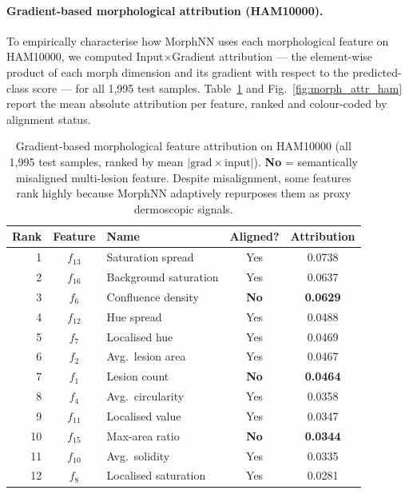 \documentclass[preprint,12pt]{elsarticle}
\begin{document}
\paragraph{Gradient-based morphological attribution (HAM10000).}
To empirically characterise how MorphNN uses each morphological feature
on HAM10000, we computed Input$\times$Gradient attribution --- the
element-wise product of each morph dimension and its gradient with
respect to the predicted-class score --- for all 1,995 test samples.
Table~\ref{tab:morph_attr} and Fig.~\ref{fig:morph_attr_ham} report
the mean absolute attribution per feature, ranked and colour-coded by
alignment status.

\begin{table}[htbp]
\centering
\caption{Gradient-based morphological feature attribution on HAM10000
  (all 1,995 test samples, ranked by mean $|\text{grad} \times \text{input}|$).
  \textbf{No} = semantically misaligned multi-lesion feature.
  Despite misalignment, some features rank highly because MorphNN
  adaptively repurposes them as proxy dermoscopic signals.}
\label{tab:morph_attr}
\setlength{\tabcolsep}{4pt}
\renewcommand{\arraystretch}{1.1}
\begin{tabular}{rclcc}
\toprule
\textbf{Rank} & \textbf{Feature} & \textbf{Name} &
  \textbf{Aligned?} & \textbf{Attribution} \\
\midrule
1  & $f_{13}$ & Saturation spread    & Yes & 0.0738 \\
2  & $f_{16}$ & Background saturation & Yes & 0.0637 \\
3  & $f_6$    & Confluence density   & \textbf{No}  & \textbf{0.0629} \\
4  & $f_{12}$ & Hue spread           & Yes & 0.0488 \\
5  & $f_7$    & Localised hue        & Yes & 0.0469 \\
6  & $f_2$    & Avg.\ lesion area    & Yes & 0.0467 \\
7  & $f_1$    & Lesion count         & \textbf{No}  & \textbf{0.0464} \\
8  & $f_4$    & Avg.\ circularity    & Yes & 0.0358 \\
9  & $f_{11}$ & Localised value      & Yes & 0.0347 \\
10 & $f_{15}$ & Max-area ratio       & \textbf{No}  & \textbf{0.0344} \\
11 & $f_{10}$ & Avg.\ solidity       & Yes & 0.0335 \\
12 & $f_8$    & Localised saturation & Yes & 0.0281 \\

\end{tabular}
\end{table}
\end{document}
